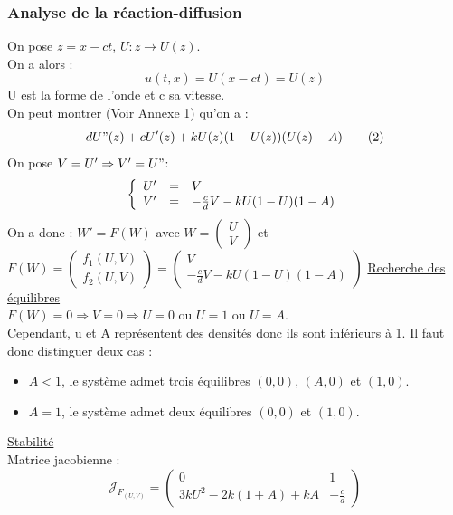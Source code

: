 \documentclass[a4paper,11pt]{article}
\begin{document}
\subsubsection{Analyse de la réaction-diffusion}
\noindent On pose $z=x-ct$, $U:z\rightarrow U(z)$.\\
On a alors : 
\begin{equation}
u(t,x)=U(x-ct)=U(z)
\tag{1}
\label{Eq1}
\end{equation}
U est la forme de l'onde et c sa vitesse.\\
On peut montrer (Voir Annexe 1) qu'on a :
\begin{equation}
dU"(z)+cU'(z)+kU(z)(1-U(z))(U(z)-A)
\tag{2}
\end{equation} 
On pose $V=U' \Rightarrow V'=U"$:
\[
\left\{
\begin{array}{r c l}
U' &=& V\\
V' &=& -\frac{c}{d}V-kU(1-U)(1-A)
\end{array}
\right.
\]
On a donc : $W'=F(W)$ avec $W=\begin{pmatrix} U \\ V \end{pmatrix}$ et $F(W)=\begin{pmatrix} f_1(U,V) \\ f_2(U,V) \end{pmatrix}=\begin{pmatrix} V \\ -\frac{c}{d}V-kU(1-U)(1-A) \end{pmatrix}$
\newline
\newline
\underline{Recherche des équilibres}\\
$F(W)=0 \Rightarrow V=0 \Rightarrow U=0 \text{ ou } U=1 \text{ ou } U=A$.\\
Cependant, u et A représentent des densités donc ils sont inférieurs à 1. Il faut donc distinguer deux cas :
\begin{itemize}
	\item $A<1$, le système admet trois équilibres $(0,0)$, $(A,0)$ et $(1,0)$.
    \item $A=1$, le système admet deux équilibres $(0,0)$ et $(1,0)$.
\end{itemize}
\vspace{0.5cm}
\underline{Stabilité}\\
Matrice jacobienne : $$\mathcal{J}_{F_{(U,V)}}=\begin{pmatrix} 0 & 1 \\ 3kU^2-2k(1+A)+kA & -\frac{c}{d}\end{pmatrix}$$
\end{document}
